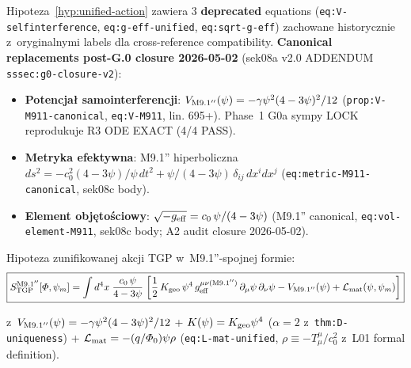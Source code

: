\begin{remark}\label{rem:hyp-unified-action-M911-canonical}

Hipoteza~\ref{hyp:unified-action} zawiera 3 \textbf{deprecated} equations
(\texttt{eq:V-selfinterference}, \texttt{eq:g-eff-unified},
\texttt{eq:sqrt-g-eff}) zachowane historycznie z~oryginalnymi labels
dla cross-reference compatibility. \textbf{Canonical replacements
post-G.0 closure 2026-05-02} (sek08a v2.0 ADDENDUM
\texttt{sssec:g0-closure-v2}):

\begin{itemize}\itemsep0pt
  \item \textbf{Potencja\l{} samointerferencji}:
    $V_{\rm M9.1''}(\psi) = -\gamma\psi^2(4-3\psi)^2/12$
    (\texttt{prop:V-M911-canonical}, \texttt{eq:V-M911}, lin. 695+).
    Phase~1 G0a sympy LOCK reprodukuje R3 ODE EXACT (4/4 PASS).
  \item \textbf{Metryka efektywna}: M9.1'' hiperboliczna
    $ds^2 = -c_0^2(4-3\psi)/\psi\,dt^2 + \psi/(4-3\psi)\,\delta_{ij}\,dx^i dx^j$
    (\texttt{eq:metric-M911-canonical}, sek08c body).
  \item \textbf{Element obj\k{e}to\'sciowy}:
    $\sqrt{-g_{\rm eff}} = c_0\,\psi/(4-3\psi)$ (M9.1'' canonical,
    \texttt{eq:vol-element-M911}, sek08c body; A2 audit closure 2026-05-02).
\end{itemize}

Hipoteza zunifikowanej akcji TGP w~M9.1''-spojnej formie:
\begin{equation}\label{eq:S-TGP-unified-M911-canonical}
  \boxed{
    S_{\rm TGP}^{\rm M9.1''}[\Phi,\psi_m]
    = \int d^4x\;\frac{c_0\,\psi}{4-3\psi}\;\biggl[
      \frac{1}{2}\,K_{\rm geo}\,\psi^4\,g_{\rm eff}^{\mu\nu(\rm M9.1'')}\,
      \partial_\mu\psi\,\partial_\nu\psi
      - V_{\rm M9.1''}(\psi)
      + \mathcal{L}_{\rm mat}(\psi,\psi_m)
    \biggr]
  }
\end{equation}

z~$V_{\rm M9.1''}(\psi) = -\gamma\psi^2(4-3\psi)^2/12$ + $K(\psi) = K_{\rm geo}\psi^4$
($\alpha=2$ z~\texttt{thm:D-uniqueness}) +
$\mathcal{L}_{\rm mat} = -(q/\PhiZero)\psi\rho$ (\texttt{eq:L-mat-unified},
$\rho \equiv -T^\mu_\mu/c_0^2$ z~L01 formal definition).


\end{remark}
